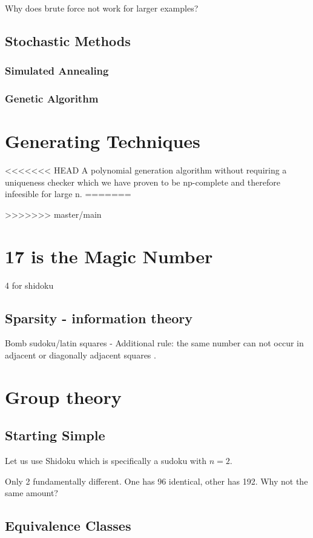 \documentclass[a4paper,12pt]{article}
\begin{document}
		Why does brute force not work for larger examples?

	\subsection{Stochastic Methods}
		\subsubsection{Simulated Annealing} 
		\subsubsection{Genetic Algorithm}
\section{Generating  Techniques}
<<<<<<< HEAD
	A polynomial generation algorithm without requiring a uniqueness checker which we have proven to be np-complete and therefore infeesible for large n.
=======
	
>>>>>>> master/main
\section{17 is the Magic Number}
	4 for shidoku
	\subsection{Sparsity - information theory}
		Bomb sudoku/latin squares - Additional rule: the same number can not occur in adjacent or diagonally adjacent squares .
\section{Group theory}
	\subsection{Starting Simple}
		Let us use Shidoku which is specifically a sudoku with $n=2$.

		Only 2 fundamentally different.
		One has 96 identical, other has 192. Why not the same amount?
		
	\subsection{Equivalence Classes}
\end{document}
